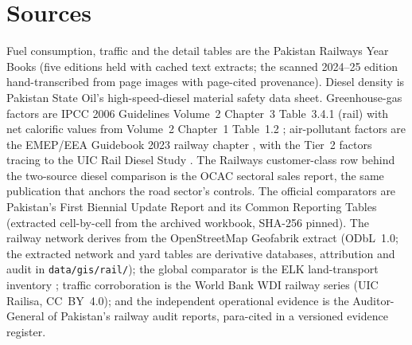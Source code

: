 \section{Sources}
\label{app:sources}

Fuel consumption, traffic and the detail tables are the Pakistan Railways Year Books
(five editions held with cached text extracts; the scanned 2024--25 edition
hand-transcribed from page images with page-cited provenance). Diesel density is Pakistan
State Oil's high-speed-diesel material safety data sheet. Greenhouse-gas factors are IPCC
2006 Guidelines Volume~2 Chapter~3 Table~3.4.1 (rail) with net calorific values from
Volume~2 Chapter~1 Table~1.2 \citep{ipcc2006energy}; air-pollutant factors are the
EMEP/EEA Guidebook 2023 railway chapter \citep{emep2023rail}, with the Tier~2 factors
tracing to the UIC Rail Diesel Study \citep{halder2005}. The Railways customer-class row
behind the two-source diesel comparison is the OCAC sectoral sales report, the same
publication that anchors the road sector's controls. The
official comparators are Pakistan's First Biennial Update Report and its Common Reporting
Tables (extracted cell-by-cell from the archived workbook, SHA-256 pinned). The railway
network derives from the OpenStreetMap Geofabrik extract \citep{osm2026} (ODbL~1.0;
the extracted network and yard tables are derivative databases, attribution and audit
in \texttt{data/gis/rail/}); the global comparator is the ELK land-transport inventory
\citep{elk2026}; traffic corroboration is the World Bank WDI railway series (UIC Railisa,
CC~BY~4.0); and the independent operational evidence is the Auditor-General of Pakistan's
railway audit reports, para-cited in a versioned evidence register.

